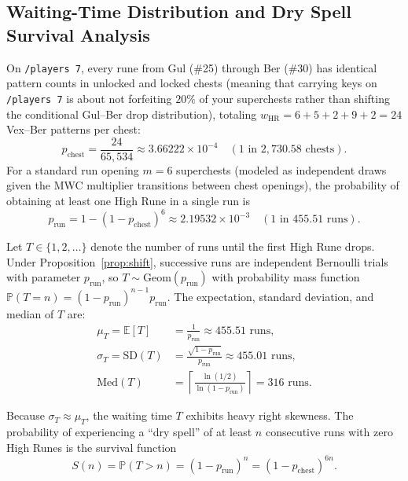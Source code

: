 \documentclass[11pt,reqno]{amsart}
\theoremstyle{definition}
\begin{document}
\subsection{Waiting-Time Distribution and Dry Spell Survival Analysis}
\label{subsec:dryspells}

On \texttt{/players~7}, every rune from Gul (\#25) through Ber (\#30) has identical pattern counts in unlocked and locked chests (meaning that carrying keys on \texttt{/players~7} is about not forfeiting $20\%$ of your superchests rather than shifting the conditional Gul--Ber drop distribution), totaling $w_{\text{HR}} = 6 + 5 + 2 + 9 + 2 = 24$ Vex--Ber patterns per chest:
\begin{equation}
    p_{\text{chest}} = \frac{24}{65{,}534} \approx 3.66222 \times 10^{-4} \quad \left(\text{1 in } 2{,}730.58\text{ chests}\right).
\end{equation}
For a standard run opening $m = 6$ superchests (modeled as independent draws given the MWC multiplier transitions between chest openings), the probability of obtaining at least one High Rune in a single run is
\begin{equation}
    p_{\text{run}} = 1 - (1 - p_{\text{chest}})^6 \approx 2.19532 \times 10^{-3} \quad \left(\text{1 in } 455.51\text{ runs}\right).
\end{equation}

Let $T \in \{1, 2, \dots\}$ denote the number of runs until the first High Rune drops. Under Proposition~\ref{prop:shift}, successive runs are independent Bernoulli trials with parameter $p_{\text{run}}$, so $T \sim \text{Geom}(p_{\text{run}})$ with probability mass function $\mathbb{P}(T = n) = (1 - p_{\text{run}})^{n-1} p_{\text{run}}$. The expectation, standard deviation, and median of $T$ are:
\begin{align}
    \mu_T = \mathbb{E}[T] &= \frac{1}{p_{\text{run}}} \approx 455.51\text{ runs}, \\
    \sigma_T = \text{SD}(T) &= \frac{\sqrt{1 - p_{\text{run}}}}{p_{\text{run}}} \approx 455.01\text{ runs}, \\
    \text{Med}(T) &= \left\lceil \frac{\ln(1/2)}{\ln(1 - p_{\text{run}})} \right\rceil = 316\text{ runs}.
\end{align}

Because $\sigma_T \approx \mu_T$, the waiting time $T$ exhibits heavy right skewness. The probability of experiencing a ``dry spell'' of at least $n$ consecutive runs with zero High Runes is the survival function
\begin{equation}
\label{eq:survival}
    S(n) = \mathbb{P}(T > n) = (1 - p_{\text{run}})^n = (1 - p_{\text{chest}})^{6n}.
\end{equation}
\end{document}
